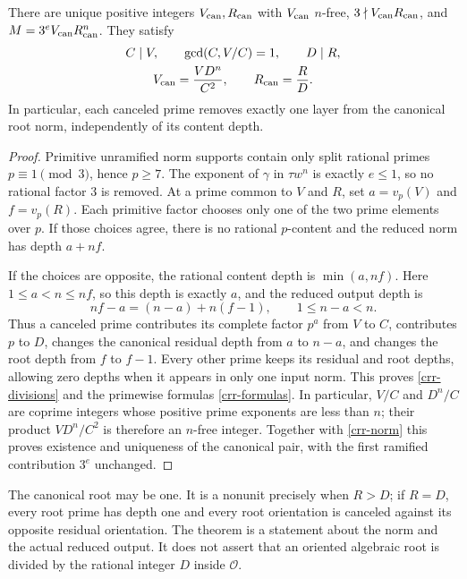 \begin{theorem}\label{crr-pair}
There are unique positive integers $V_{\rm can},R_{\rm can}$ with
$V_{\rm can}$ $n$-free, $3\nmid V_{\rm can}R_{\rm can}$, and
$M=3^eV_{\rm can}R_{\rm can}^n$. They satisfy
\begin{gather}
 C\mid V,\qquad \gcd(C,V/C)=1,\qquad D\mid R,\label{crr-divisions}\\
 V_{\rm can}=\frac{VD^n}{C^2},\qquad
 R_{\rm can}=\frac RD.\label{crr-formulas}
\end{gather}
In particular, each canceled prime removes exactly one layer from
the canonical root norm, independently of its content depth.
\end{theorem}
\begin{proof}
Primitive unramified norm supports contain only split rational primes
$p\equiv1\pmod3$, hence $p\ge7$. The exponent of $\gamma$ in
$\tau w^n$ is exactly $e\le1$, so no rational factor $3$ is removed.
At a prime common to $V$ and $R$, set $a=v_p(V)$ and $f=v_p(R)$.
Each primitive factor chooses only one of the two prime elements
over $p$. If those choices agree, there is no rational $p$-content
and the reduced norm has depth $a+nf$.

If the choices are opposite, the rational content depth is
$\min(a,nf)$. Here $1\le a<n\le nf$, so this depth is exactly $a$,
and the reduced output depth is
\begin{equation}\label{crr-reflection}
 nf-a=(n-a)+n(f-1),\qquad 1\le n-a<n.
\end{equation}
Thus a canceled prime contributes its complete factor $p^a$ from
$V$ to $C$, contributes $p$ to $D$, changes the canonical residual
depth from $a$ to $n-a$, and changes the root depth from $f$ to $f-1$.
Every other prime keeps its residual and root depths, allowing zero
depths when it appears in only one input norm. This proves
\eqref{crr-divisions} and the primewise formulas
\eqref{crr-formulas}. In particular, $V/C$ and $D^n/C$ are coprime
integers whose positive prime exponents are less than $n$; their product
$VD^n/C^2$ is therefore an $n$-free integer. Together with
\eqref{crr-norm} this proves existence and uniqueness of the canonical
pair, with the first ramified contribution $3^e$ unchanged.
\end{proof}

The canonical root may be one. It is a nonunit precisely when $R>D$;
if $R=D$, every root prime has depth one and every root orientation
is canceled against its opposite residual orientation. The theorem
is a statement about the norm and the actual reduced output. It does
not assert that an oriented algebraic root is divided by the rational
integer $D$ inside $\mathcal O$.

